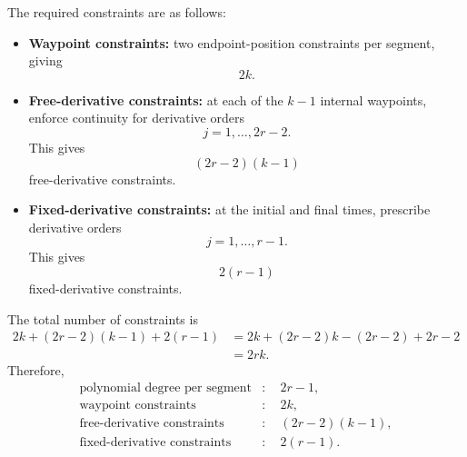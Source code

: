 \documentclass[11pt]{article}
\begin{document}
The required constraints are as follows:
\begin{itemize}
    \item \textbf{Waypoint constraints:}
    two endpoint-position constraints per segment, giving
    \begin{equation}
        2k.
    \end{equation}

    \item \textbf{Free-derivative constraints:}
    at each of the $k-1$ internal waypoints, enforce continuity for
    derivative orders
    \begin{equation}
        j=1,\ldots,2r-2.
    \end{equation}
    This gives
    \begin{equation}
        (2r-2)(k-1)
    \end{equation}
    free-derivative constraints.

    \item \textbf{Fixed-derivative constraints:}
    at the initial and final times, prescribe derivative orders
    \begin{equation}
        j=1,\ldots,r-1.
    \end{equation}
    This gives
    \begin{equation}
        2(r-1)
    \end{equation}
    fixed-derivative constraints.
\end{itemize}

The total number of constraints is
\begin{align}
    2k+(2r-2)(k-1)+2(r-1)
    &=2k+(2r-2)k-(2r-2)+2r-2 \\
    &=2rk.
\end{align}
Therefore,
\begin{equation}
    \boxed{
    \begin{aligned}
        \text{polynomial degree per segment} &:\quad 2r-1, \\
        \text{waypoint constraints} &:\quad 2k, \\
        \text{free-derivative constraints} &:\quad (2r-2)(k-1), \\
        \text{fixed-derivative constraints} &:\quad 2(r-1).
    \end{aligned}}
\end{equation}
\end{document}
